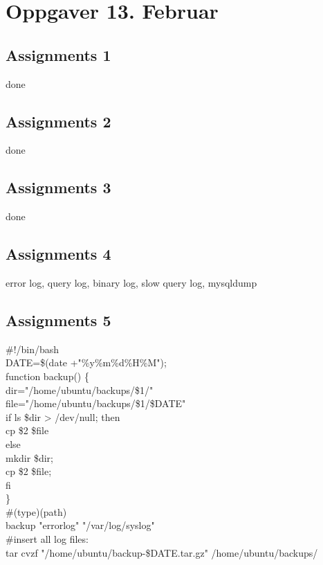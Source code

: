 \section{Oppgaver 13. Februar}

\subsection{Assignments 1} 
done
\subsection{Assignments 2}
done
\subsection{Assignments 3}
done
\subsection{Assignments 4} 
error log, query log, binary log, slow query log, mysqldump

\subsection{Assignments 5} 
\#!/bin/bash\\

DATE=\$(date +"\%y\%m\%d\%H\%M");\\

function backup() \{\\
dir="/home/ubuntu/backups/\$1/"\\
file="/home/ubuntu/backups/\$1/\$DATE"\\
        if ls \$dir > /dev/null; then\\
                cp \$2 \$file\\
        else\\
                mkdir \$dir;\\
                cp \$2 \$file;\\
        fi\\
\}\\

\#(type)(path)\\
backup "errorlog" "/var/log/syslog"\\
\#insert all log files:\\

tar cvzf "/home/ubuntu/backup-\$DATE.tar.gz" /home/ubuntu/backups/\\

